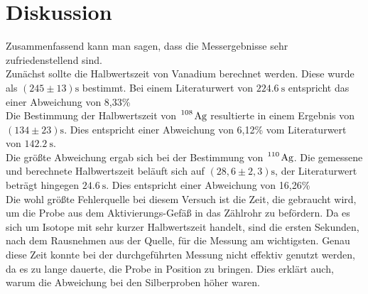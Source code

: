 \section{Diskussion}
\label{sec:Diskussion}

Zusammenfassend kann man sagen, dass die Messergebnisse sehr zufriedenstellend sind.\\
Zunächst sollte die Halbwertszeit von Vanadium berechnet werden. Diese wurde als $(245 \pm 13) \si{\second}$ bestimmt. Bei einem Literaturwert von $\SI{224,6}{\second}$
entspricht das einer Abweichung von 8,33\% \\
Die Bestimmung der Halbwertszeit von $\ce{^108 Ag}$ resultierte in einem Ergebnis von $(134 \pm 23) \si{\second}$. Dies entspricht einer Abweichung von 6,12\% vom
Literaturwert von $\SI{142,2}{\second}$.\\
Die größte Abweichung ergab sich bei der Bestimmung von $\ce{^110 Ag}$. Die gemessene und berechnete Halbwertszeit beläuft sich auf $(28,6 \pm 2,3) \si{\second}$, der
Literaturwert beträgt hingegen $\SI{24,6}{\second}$. Dies entspricht einer Abweichung von 16,26\% \\
\newline
Die wohl größte Fehlerquelle bei diesem Versuch ist die Zeit, die gebraucht wird, um die Probe aus dem Aktivierungs-Gefäß in das Zählrohr zu befördern. Da es sich um
Isotope mit sehr kurzer Halbwertszeit handelt, sind die ersten Sekunden, nach dem Rausnehmen aus der Quelle, für die Messung am wichtigsten. Genau diese Zeit konnte
bei der durchgeführten Messung nicht effektiv genutzt werden, da es zu lange dauerte, die Probe in Position zu bringen. Dies erklärt auch, warum die Abweichung bei den
Silberproben höher waren.